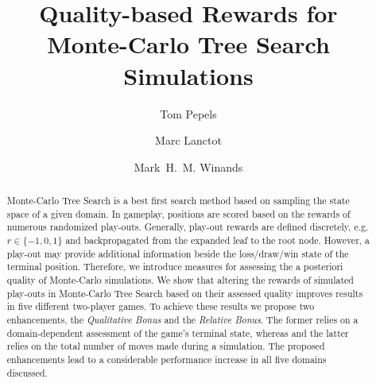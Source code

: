 \documentclass{ecai2010}
\begin{document}
\title{Quality-based Rewards for \\ Monte-Carlo Tree Search Simulations}

\author{Tom Pepels \and Marc Lanctot \and Mark~H.~M. Winands  }

\maketitle


\begin{abstract}
Monte-Carlo Tree Search is a best first search method based on sampling the state space of a given domain. In gameplay, positions are scored based on the rewards of numerous randomized play-outs. Generally, play-out rewards are defined discretely, e.g. $r \in \{-1, 0, 1\}$ and backpropagated from the expanded leaf to the root node. However, a play-out may provide additional information beside the loss/draw/win state of the terminal position. Therefore, we introduce measures for assessing the a posteriori quality of Monte-Carlo simulations. We show that altering the rewards of simulated play-outs in Monte-Carlo Tree Search based on their assessed quality improves results in five different two-player games. To achieve these results we propose two enhancements, the \emph{Qualitative Bonus} and the \emph{Relative Bonus}. The former relies on a domain-dependent assessment of the game's terminal state, whereas and the latter relies on the total number of moves made during a simulation. The proposed enhancements lead to a considerable performance increase in all five domains discussed.
\end{abstract}

\end{document}

